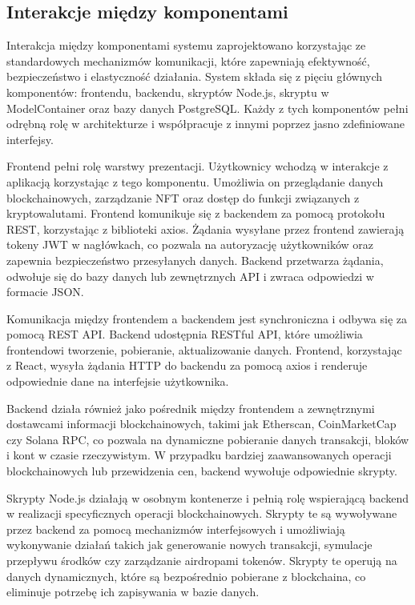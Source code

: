 \subsection{Interakcje między komponentami}
Interakcja między komponentami systemu zaprojektowano korzystając ze standardowych mechanizmów komunikacji, które zapewniają efektywność, bezpieczeństwo i elastyczność działania. System składa się z pięciu głównych komponentów: frontendu, backendu, skryptów Node.js, skryptu w ModelContainer oraz bazy danych PostgreSQL. Każdy z tych komponentów pełni odrębną rolę w architekturze i współpracuje z innymi poprzez jasno zdefiniowane interfejsy.

Frontend pełni rolę warstwy prezentacji. Użytkownicy wchodzą w interakcje z aplikacją korzystając z tego komponentu. Umożliwia on przeglądanie danych blockchainowych, zarządzanie NFT oraz dostęp do funkcji związanych z kryptowalutami. Frontend komunikuje się z backendem za pomocą protokołu REST, korzystając z biblioteki axios. Żądania wysyłane przez frontend zawierają tokeny JWT w nagłówkach, co pozwala na autoryzację użytkowników oraz zapewnia bezpieczeństwo przesyłanych danych. Backend przetwarza żądania, odwołuje się do bazy danych lub zewnętrznych API i zwraca odpowiedzi w formacie JSON.

Komunikacja między frontendem a backendem jest synchroniczna i odbywa się za pomocą REST API. Backend udostępnia RESTful API, które umożliwia frontendowi tworzenie, pobieranie, aktualizowanie danych. Frontend, korzystając z React, wysyła żądania HTTP do backendu za pomocą axios i renderuje odpowiednie dane na interfejsie użytkownika.

Backend działa również jako pośrednik między frontendem a zewnętrznymi dostawcami informacji blockchainowych, takimi jak Etherscan, CoinMarketCap czy Solana RPC, co pozwala na dynamiczne pobieranie danych transakcji, bloków i kont w czasie rzeczywistym. W przypadku bardziej zaawansowanych operacji blockchainowych lub przewidzenia cen, backend wywołuje odpowiednie skrypty. %

Skrypty Node.js działają w osobnym kontenerze i pełnią rolę wspierającą backend w realizacji specyficznych operacji blockchainowych. Skrypty te są wywoływane przez backend za pomocą mechanizmów interfejsowych i umożliwiają wykonywanie działań takich jak generowanie nowych transakcji, symulacje przepływu środków czy zarządzanie airdropami tokenów. Skrypty te operują na danych dynamicznych, które są bezpośrednio pobierane z blockchaina, co eliminuje potrzebę ich zapisywania w bazie danych.


